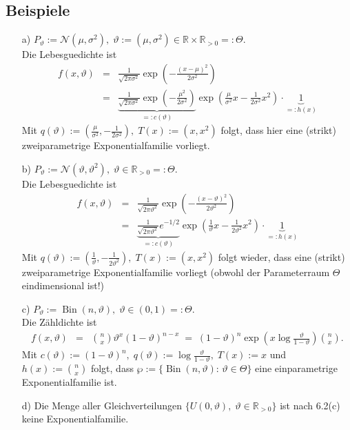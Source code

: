 \documentclass[a4paper,11pt,twoside,titlepage]{article}
\newcommand{\R}{{\mathbb R}}
\newcommand\NN{ \mathcal{N} } %
\DeclareMathOperator{\Bin}{Bin}
\begin{document}
\subsection{Beispiele}
\begin{itemize}
\item[a)]
$P_\vartheta := \NN(\mu,\sigma^2), \; \vartheta:=(\mu,\sigma^2)\in\R\times\R_{>0}=:\Theta.$\\
Die Lebesguedichte ist
\begin{eqnarray*}
  f(x,\vartheta) &=& \frac1{\sqrt{2\pi\sigma^2}}
  \exp \left( - \frac{(x-\mu)^2}{2\sigma^2}\right) \\
   &=& \underbrace{\frac1{\sqrt{2\pi\sigma^2}}
   \exp \left( -\frac{\mu^2}{2\sigma^2}\right)}_{=: c(\vartheta)}
   \exp \left( \frac\mu{\sigma^2} x -\frac1{2\sigma^2} x^2\right)
   \cdot \underbrace{1}_{=: h(x)}
\end{eqnarray*}
Mit $q(\vartheta):=(\frac\mu{\sigma^2},-\frac1{2\sigma^2}),\; T(x):=(x,x^2)$
folgt, dass hier eine (strikt) zweiparametrige Exponentialfamilie vorliegt.
\item[b)]
$P_\vartheta := \NN(\vartheta,\vartheta^2), \; \vartheta \in \R_{>0} =: \Theta.$\\
Die Lebesguedichte ist
\begin{eqnarray*}
  f(x,\vartheta) &=& \frac1{\sqrt{2\pi\vartheta^2}}
  \exp \left( - \frac{(x-\vartheta)^2}{2\vartheta^2}\right) \\
   &=& \underbrace{\frac1{\sqrt{2\pi\vartheta^2}}
    e^{-1/2}}_{=: c(\vartheta)}
   \exp \left( \frac{1}{\vartheta} x - \frac1{2\vartheta^2} x^2\right)
   \cdot \underbrace{1}_{=: h(x)}
\end{eqnarray*}
Mit $q(\vartheta):=(\frac{1}{\vartheta},-\frac1{2\vartheta^2}),\; T(x):=(x,x^2)$
folgt wieder, dass eine (strikt) zweiparametrige Exponentialfamilie vorliegt
(obwohl der Parameterraum $\Theta$ eindimensional ist!)
\item[c)]
$P_\vartheta :=\Bin(n,\vartheta), \; \vartheta \in (0,1)=:\Theta.$\\ Die Zähldichte ist
\begin{eqnarray*}
  f(x,\vartheta) &=& { n \choose x} \vartheta^x (1-\vartheta)^{n-x}
   \;=\; (1-\vartheta)^n \exp\left(x \log\frac\vartheta{1-\vartheta}\right) {n \choose x}.
\end{eqnarray*}
Mit $c(\vartheta):=(1-\vartheta)^n, \; q(\vartheta):=\log\frac\vartheta{1-\vartheta},
\; T(x):=x$ und $h(x):={n \choose x}$ folgt, dass
$\wp := \{ \Bin(n, \vartheta): \, \vartheta \in \Theta\}$ eine einparametrige
Exponentialfamilie ist.
\item[d)]
Die Menge aller Gleichverteilungen $\{U(0,\vartheta),\; \vartheta\in\R_{>0}\}$ ist
nach 6.2(c) keine Exponentialfamilie.
\end{itemize}
\end{document}
